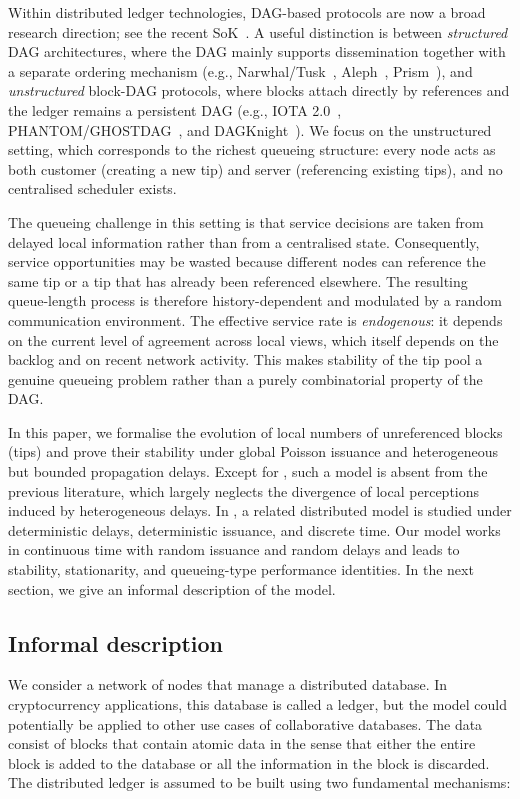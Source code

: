 \documentclass[a4paper,12pt,oneside,reqno]{amsart}
\newcommand{\1}{{\mathbf 1}}
\begin{document}
Within distributed ledger technologies, DAG-based protocols are now a broad research direction; see the recent SoK~\cite{Raikwar2024SoKDAGConsensus}. A useful distinction is between \emph{structured} DAG architectures, where the DAG mainly supports dissemination together with a separate ordering mechanism (e.g., Narwhal/Tusk~\cite{Narwhal22}, Aleph~\cite{gkagol2019aleph}, Prism~\cite{bagaria2019prism}), and \emph{unstructured} block-DAG protocols, where blocks attach directly by references and the ledger remains a persistent DAG (e.g., IOTA 2.0~\cite{OTV,popov2020coordicide}, PHANTOM/GHOSTDAG~\cite{phantom}, and DAGKnight~\cite{SuttonSompolinsky2022DAGKnight}). We focus on the unstructured setting, which corresponds to the richest queueing structure: every node acts as both customer (creating a new tip) and server (referencing existing tips), and no centralised scheduler exists.

The queueing challenge in this setting is that service decisions are taken from delayed local information rather than from a centralised state.  Consequently, service opportunities may be wasted because different nodes can reference the same tip or a tip that has already been referenced elsewhere. The resulting queue-length process is therefore history-dependent and modulated by a random communication environment. The effective service rate is \emph{endogenous}: it depends on the current level of agreement across local views, which itself depends on the backlog and on recent network activity. This makes stability of the tip pool a genuine queueing problem rather than a purely combinatorial property of the DAG.

In this paper, we formalise the evolution of local numbers of unreferenced blocks (tips) and prove their stability under global Poisson issuance and heterogeneous but bounded propagation delays. Except for \cite{kumar2022effect}, such a model is absent from the previous literature, which largely neglects the divergence of local perceptions induced by heterogeneous delays. In \cite{kumar2022effect}, a related distributed model is studied under deterministic delays, deterministic issuance, and discrete time. Our model works in continuous time with random issuance and random delays and leads to stability, stationarity, and queueing-type performance identities. In the next section, we give an informal description of the model.

\subsection{Informal description}
We consider a network of nodes that manage a distributed database. In cryptocurrency applications, this database is called a ledger, but the model could potentially be applied to other use cases of collaborative databases. The data consist of blocks that contain atomic data in the sense that either the entire block is added to the database or all the information in the block is discarded. 
The distributed ledger is assumed to be built using two fundamental mechanisms:
\end{document}
